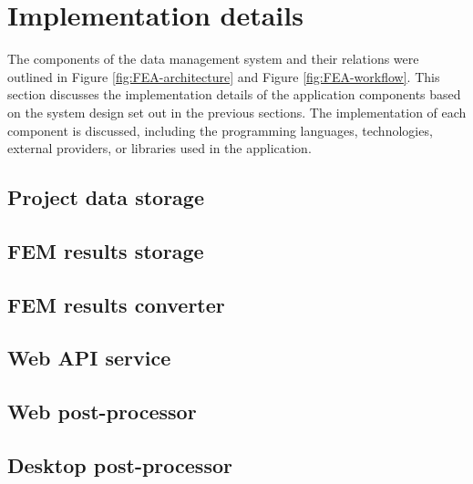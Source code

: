 \section{Implementation details}
\label{sec:implementation-details}

The components of the data management system and their relations were outlined in Figure \ref{fig:FEA-architecture} and Figure \ref{fig:FEA-workflow}. This section discusses the implementation details of the application components based on the system design set out in the previous sections. The implementation of each component is discussed, including the programming languages, technologies, external providers, or libraries used in the application.


\subsection*{Project data storage}

\subsection*{FEM results storage}

\subsection*{FEM results converter}

\subsection*{Web API service}

\subsection*{Web post-processor}

\subsection*{Desktop post-processor}
